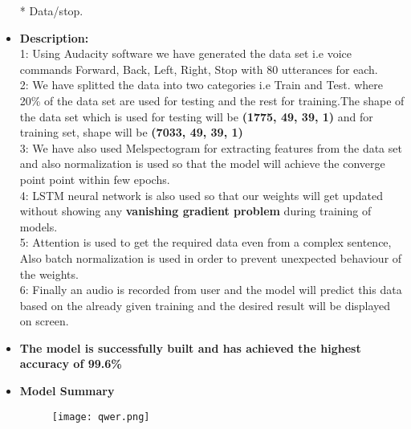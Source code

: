\documentclass{article}
\begin{document}
\begin{itemize}
\item[*]{Data/stop}.\\
\newpage

\item{\textbf{Description:}}\\

1: Using Audacity software we have generated the data set i.e voice commands Forward, Back, Left, Right, Stop with 80 utterances for each.\\

2: We have splitted the data into two categories i.e Train and Test. where 20\% of the data set are used for testing and the rest for training.The shape of the data set which is used for testing will be \textbf{(1775, 49, 39, 1)} and for training set, shape will be \textbf{(7033, 49, 39, 1)}\\

3: We have also used Melspectogram for extracting features from the data set and also normalization is used so that the model will achieve the converge point point within few epochs.\\

4: LSTM neural network is also used so that our weights will get updated without showing any \textbf{vanishing gradient problem} during training of models. \\

5: Attention is used to get the required data even from a complex sentence, Also batch normalization is used in order to prevent unexpected behaviour of the weights.\\

6: Finally an audio is recorded from user and the model will predict this data based on the already given training and the desired result will be displayed on screen.\\


\item{\textbf{The model is successfully built and has achieved the highest accuracy of 99.6\%}}\\

\newpage

\item{\textbf{Model Summary}}\\

\begin{figure}[h]
\texttt{[image: qwer.png]}
\end{figure}

\\


\end{itemize}
\end{document}
